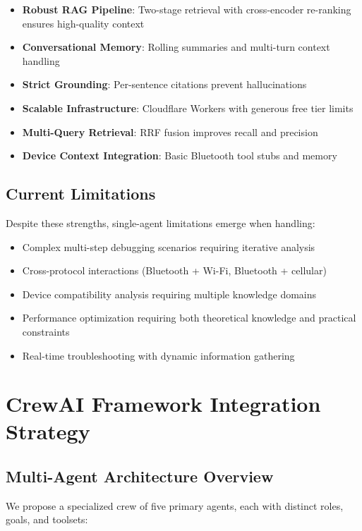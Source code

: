 \documentclass[11pt, a4paper]{article}
\begin{document}
\begin{itemize}
    \item \textbf{Robust RAG Pipeline}: Two-stage retrieval with cross-encoder re-ranking ensures high-quality context
    \item \textbf{Conversational Memory}: Rolling summaries and multi-turn context handling
    \item \textbf{Strict Grounding}: Per-sentence citations prevent hallucinations
    \item \textbf{Scalable Infrastructure}: Cloudflare Workers with generous free tier limits
    \item \textbf{Multi-Query Retrieval}: RRF fusion improves recall and precision
    \item \textbf{Device Context Integration}: Basic Bluetooth tool stubs and memory
\end{itemize}

\subsection{Current Limitations}
Despite these strengths, single-agent limitations emerge when handling:

\begin{itemize}
    \item Complex multi-step debugging scenarios requiring iterative analysis
    \item Cross-protocol interactions (Bluetooth + Wi-Fi, Bluetooth + cellular)
    \item Device compatibility analysis requiring multiple knowledge domains
    \item Performance optimization requiring both theoretical knowledge and practical constraints
    \item Real-time troubleshooting with dynamic information gathering
\end{itemize}

\section{CrewAI Framework Integration Strategy}

\subsection{Multi-Agent Architecture Overview}

We propose a specialized crew of five primary agents, each with distinct roles, goals, and toolsets:
\end{document}
